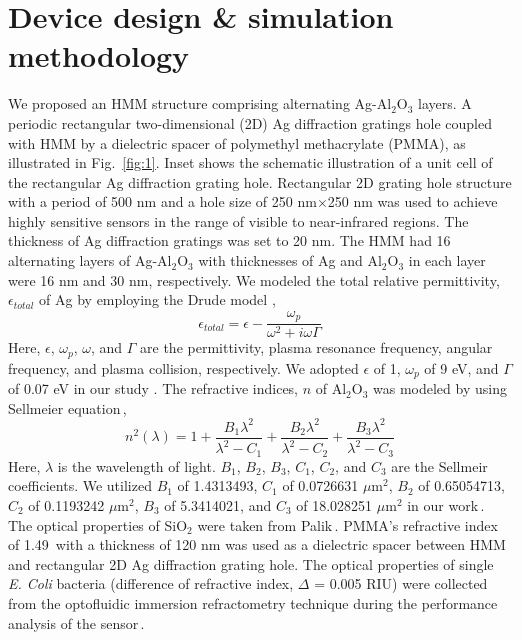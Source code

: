 \documentclass[conference]{IEEEtran}
\begin{document}
\section{Device design \& simulation methodology}
We proposed an HMM structure comprising alternating Ag-Al$_2$O$_3$ layers. A periodic rectangular two-dimensional (2D) Ag diffraction gratings hole coupled with HMM by a dielectric spacer of polymethyl methacrylate (PMMA), as illustrated in Fig.~\ref{fig:1}. Inset shows the schematic illustration of a unit cell of the rectangular Ag diffraction grating hole.  Rectangular 2D grating hole structure with a period of 500 nm and a hole size of 250 nm$\times$250 nm was used to achieve highly sensitive sensors in the range of visible to near-infrared regions. The thickness of Ag diffraction gratings was set to 20 nm. The HMM had 16 alternating layers of Ag-Al$_2$O$_3$ with thicknesses of Ag and Al$_2$O$_3$ in each layer were 16 nm and 30 nm, respectively. We modeled the total relative permittivity, $\epsilon_{total}$ of Ag by employing the Drude model \cite{Drude},
\begin{equation}
    \epsilon_{total} = \epsilon - \frac{\omega_p}{\omega^2 + i \omega \Gamma}
    \label{Eq. 1}
\end{equation}
Here, $\epsilon$, $\omega_p$, $\omega$, and $\Gamma$ are the permittivity, plasma resonance frequency, angular frequency, and plasma collision, respectively. We adopted $\epsilon$ of 1, $\omega_p$ of 9 eV, and $\Gamma$ of 0.07 eV in our study \cite{Kravets}. The refractive indices, $n$ of Al$_2$O$_3$ was modeled by using Sellmeier equation\,\cite{Malitson},
\begin{equation}
    n^2(\lambda) = 1+ \frac{B_1 \lambda^2}{\lambda^2 - C_1} + \frac{B_2 \lambda^2}{\lambda^2 - C_2} + \frac{B_3 \lambda^2}{\lambda^2 - C_3}
    \label{Eq. 2}
\end{equation}
Here, $\lambda$ is the wavelength of light. $B_1$, $B_2$, $B_3$, $C_1$, $C_2$, and $C_3$ are the Sellmeir coefficients. We utilized $B_1$ of 1.4313493, $C_1$ of 0.0726631 $\mu$m$^2$, $B_2$ of 0.65054713, $C_2$ of 0.1193242 $\mu$m$^2$, $B_3$ of 5.3414021, and $C_3$ of 18.028251 $\mu$m$^2$ in our work\,\cite{Malitson}. The optical properties of SiO$_2$ were taken from Palik\,\cite{Palik}. PMMA's refractive index of 1.49\,\cite{Beadie} with a thickness of 120 nm was used as a dielectric spacer between HMM and rectangular 2D Ag diffraction grating hole. The optical properties of single \textit{E. Coli} bacteria (difference of refractive index, $\Delta$ = 0.005 RIU) were collected from the optofluidic immersion refractometry technique during the performance analysis of the sensor\,\cite{Liu}.
\end{document}
